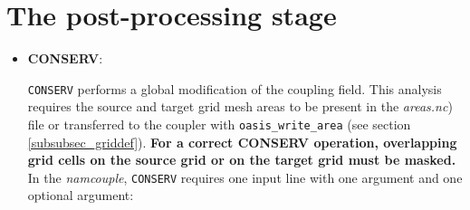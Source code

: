 \section{The post-processing stage}
\label{subsec_cooking}

\begin{itemize}

\item {\bf CONSERV}:

  {\tt CONSERV} performs a global modification of the coupling field.
  This analysis requires the source and target grid mesh areas to be
  present in the {\it areas.nc}) file or transferred to the coupler with {\tt oasis\_write\_area} (see section
  \ref{subsubsec_griddef}). {\bf For a correct CONSERV operation,
    overlapping grid cells on the source grid or on the target grid
    must be masked.} In the {\it namcouple}, {\tt CONSERV} requires
  one input line with one argument and one optional argument:


\end{itemize}
